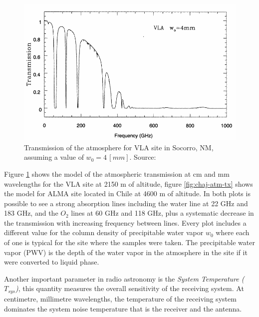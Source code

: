 \begin{figure}[]
\includegraphics[width=\textwidth]{images/vla-atm-transmission}
\caption[Transmission of the atmosphere for VLA site in Socorro, NM]{Transmission of the atmosphere for VLA site in Socorro, NM, assuming a value of $w_0 = 4\,[mm]$. Source: \cite{taylor99}}
\label{fig:vla-atm-tx}
\end{figure}

Figure \ref{fig:vla-atm-tx} shows the model of the atmospheric transmission at cm and mm wavelengths for the VLA site at 2150 m of altitude, figure \ref{fig:chaj-atm-tx} shows the model for ALMA site located in Chile at 4600 m of altitude. In both plots is possible to see a strong absorption lines including the water line at 22 GHz and 183 GHz, and the $O_2$ lines at 60 GHz and 118 GHz, plus a systematic decrease in the transmission with increasing frequency between lines. Every plot includes a different value for the column density of precipitable water vapor $w_0$ where each of one is typical for the site where the samples were taken. The precipitable water vapor (PWV) is the depth of the water vapor in the atmosphere in the site if it were converted to liquid phase.

Another important parameter in radio astronomy is the \textit{System Temperature ($T_{sys}$)}, this quantity measures the overall sensitivity of the receiving system. At centimetre, millimetre wavelengths, the temperature of the receiving system dominates the system noise temperature that is the receiver and the antenna. 

